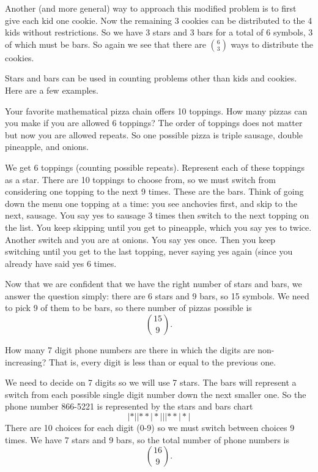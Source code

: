 \documentclass[12pt]{article}
\begin{document}
Another (and more general) way to approach this modified problem is to first give each kid one cookie.  Now the remaining 3 cookies can be distributed to the 4 kids without restrictions.  So we have 3 stars and 3 bars for a total of 6 symbols, 3 of which must be bars.  So again we see that there are ${6 \choose 3}$ ways to distribute the cookies.



Stars and bars can be used in counting problems other than kids and cookies.  Here are a few examples.

\begin{example}
  Your favorite mathematical pizza chain offers 10 toppings.  How many pizzas can you make if you are allowed 6 toppings?  The order of toppings does not matter but now you are allowed repeats.  So one possible pizza is triple sausage, double pineapple, and onions.
  \begin{solution}
    We get 6 toppings (counting possible repeats).  Represent each of these toppings as a star.  There are 10 toppings to choose from, so we must switch from considering one topping to the next 9 times.  These are the bars.  Think of going down the menu one topping at a time: you see anchovies first, and skip to the next, sausage.  You say yes to sausage 3 times then switch to the next topping on the list.  You keep skipping until you get to pineapple, which you say yes to twice.  Another switch and you are at onions.  You say yes once.  Then you keep switching until you get to the last topping, never saying yes again (since you already have said yes 6 times.
    
    Now that we are confident that we have the right number of stars and bars, we answer the question simply: there are 6 stars and 9 bars, so 15 symbols.  We need to pick 9 of them to be bars, so there number of pizzas possible is
    \[{15 \choose 9}.\]
  \end{solution}
\end{example}


\begin{example}
  How many 7 digit phone numbers are there in which the digits are non-increasing?  That is, every digit is less than or equal to the previous one.


\begin{solution}
  We need to decide on 7 digits so we will use 7 stars.  The bars will represent a switch from each possible single digit number down the next smaller one.  So the phone number 866-5221 is represented by the stars and bars chart
  \[|*||**|*|||**|*|\]
  There are 10 choices for each digit (0-9) so we must switch between choices 9 times.  We have 7 stars and 9 bars, so the total number of phone numbers is
  \[{16 \choose 9}.\]
\end{solution}
\end{example}
\end{document}
